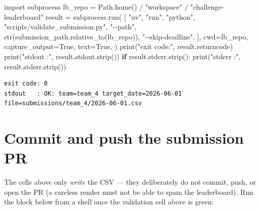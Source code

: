 \documentclass[
  english,
  letterpaper,
]{scrbook}
\newenvironment{Shaded}{\begin{snugshade}}{\end{snugshade}}
\newcommand{\BuiltInTok}[1]{\textcolor[rgb]{0.00,0.23,0.31}{#1}}
\newcommand{\ControlFlowTok}[1]{\textcolor[rgb]{0.00,0.23,0.31}{\textbf{#1}}}
\newcommand{\ImportTok}[1]{\textcolor[rgb]{0.00,0.46,0.62}{#1}}
\newcommand{\NormalTok}[1]{\textcolor[rgb]{0.00,0.23,0.31}{#1}}
\newcommand{\OperatorTok}[1]{\textcolor[rgb]{0.37,0.37,0.37}{#1}}
\newcommand{\StringTok}[1]{\textcolor[rgb]{0.13,0.47,0.30}{#1}}
\newcommand{\VariableTok}[1]{\textcolor[rgb]{0.07,0.07,0.07}{#1}}
\begin{document}
\protect{}\label{team4-validate}
\begin{Shaded}
\begin{Highlighting}[]
\ImportTok{import}\NormalTok{ subprocess}
\NormalTok{lb\_repo }\OperatorTok{=}\NormalTok{ Path.home() }\OperatorTok{/} \StringTok{"workspace"} \OperatorTok{/} \StringTok{"challenge{-}leaderboard"}
\NormalTok{result }\OperatorTok{=}\NormalTok{ subprocess.run(}
\NormalTok{    [}
        \StringTok{"uv"}\NormalTok{, }\StringTok{"run"}\NormalTok{, }\StringTok{"python"}\NormalTok{, }\StringTok{"scripts/validate\_submission.py"}\NormalTok{,}
        \StringTok{"{-}{-}path"}\NormalTok{, }\BuiltInTok{str}\NormalTok{(submission\_path.relative\_to(lb\_repo)),}
        \StringTok{"{-}{-}skip{-}deadline"}\NormalTok{,}
\NormalTok{    ],}
\NormalTok{    cwd}\OperatorTok{=}\NormalTok{lb\_repo,}
\NormalTok{    capture\_output}\OperatorTok{=}\VariableTok{True}\NormalTok{,}
\NormalTok{    text}\OperatorTok{=}\VariableTok{True}\NormalTok{,}
\NormalTok{)}
\BuiltInTok{print}\NormalTok{(}\StringTok{"exit code:"}\NormalTok{, result.returncode)}
\BuiltInTok{print}\NormalTok{(}\StringTok{"stdout   :"}\NormalTok{, result.stdout.strip())}
\ControlFlowTok{if}\NormalTok{ result.stderr.strip():}
    \BuiltInTok{print}\NormalTok{(}\StringTok{"stderr   :"}\NormalTok{, result.stderr.strip())}
\end{Highlighting}
\end{Shaded}

\begin{verbatim}
exit code: 0
stdout   : OK: team=team_4 target_date=2026-06-01 file=submissions/team_4/2026-06-01.csv
\end{verbatim}

\section{Commit and push the submission PR}\label{sec-team4-push}

The cells above only \emph{write} the CSV --- they deliberately do not
commit, push, or open the PR (a careless render must not be able to spam
the leaderboard). Run the block below from a shell once the validation
cell above is green:
\end{document}
